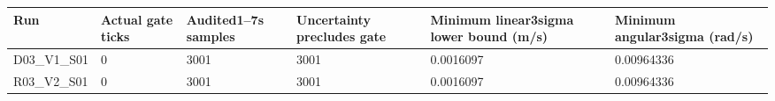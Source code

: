 \begin{tabular}{llllll}
\hline
Run & Actual gate ticks & Audited1–7s samples & Uncertainty precludes gate & Minimum linear3sigma lower bound (m/s) & Minimum angular3sigma (rad/s) \\
\hline
D03\_V1\_S01 & 0 & 3001 & 3001 & 0.0016097 & 0.00964336 \\
R03\_V2\_S01 & 0 & 3001 & 3001 & 0.0016097 & 0.00964336 \\
\hline
\end{tabular}
